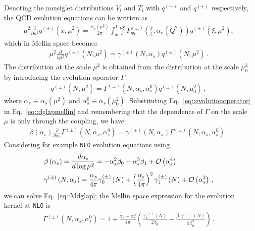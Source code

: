 Denoting the nonsiglet distributions $V_i$ and $T_i$ with $q^{(-)}$ and
$q^{(+)} $ respectively, the QCD evolution equations can be written as
\begin{align}
    \mu^2\frac{\partial }{\partial \mu^2} q^{(\pm)}\left(x,\mu^2\right) = 
    \frac{\alpha_s(\mu^2)}{2\pi}
    \int_{x}^{1}\frac{d\xi}{\xi}\, 
    P_{qq}^{(\pm)}\left(\frac{x}{\xi},\alpha_s(Q^2)\right)
    q^{(\pm)}\left(\xi,\mu^2\right),
\end{align}
which in Mellin space becomes
\begin{align}
\label{eq::dglapmellin}
    \mu^2\frac{\partial }{\partial \mu^2} q^{(\pm)}\left(N,\mu^2\right) = 
    \gamma^{(\pm)}\left(N, \alpha_s\right) q^{(\pm)}\left(N,\mu^2\right)\, .
\end{align}
The distribution at the scale $\mu^2$ is obtained from the distribution at the
scale $\mu_0^2$ by introducing the evolution operator $\Gamma$
\begin{align}
\label{eq::evolutionoperator}
    q^{(\pm)}\left(N,\mu^2\right) = 
    \Gamma^{(\pm)}\left(N,\alpha_s,\alpha_s^0\right)
    q^{(\pm)}\left(N,\mu_0^2\right)\, ,
\end{align}
where $\alpha_s \equiv \alpha_s\left(\mu^2\right)$ and $\alpha_s^0 \equiv
\alpha_s\left(\mu_0^2\right)$. Substituting Eq.~\eqref{eq::evolutionoperator} in
Eq.~\eqref{eq::dglapmellin} and remembering that the dependence of $\Gamma$ on
the scale $\mu$ is only through the coupling, we have
\begin{align}
\label{eq::Mdglap}
    \beta\left(\alpha_s\right) \frac{\partial}{\partial\alpha_s}
    \Gamma^{(\pm)}\left(N,\alpha_s,\alpha_s^0\right) = 
    \gamma^{(\pm)}\left(N, \alpha_s\right)
    \Gamma^{(\pm)}\left(N,\alpha_s,\alpha_s^0\right)\, .
\end{align}
%
Considering for example {\tt NLO} evolution equations using 
\begin{align}
    & \beta\left(\alpha_s\right) = \frac{d\alpha_s}{d\log \mu^2} = 
    -\alpha_s^2 \beta_0 -\alpha_s^3 \beta_1 + \mathcal{O}\left( \alpha_s^4 \right)  \\
    & \gamma^{(\pm)}\left(N, \alpha_s\right) = 
    \frac{\alpha_s}{4\pi} \gamma^{(\pm)}_0\left(N\right) + 
    \left(\frac{\alpha_s}{4\pi}\right)^2 \gamma^{(\pm)}_1\left(N\right) + \mathcal{O}\left( \alpha_s^3 \right)\, ,
\end{align}
we can solve Eq.~\eqref{eq::Mdglap}; the Mellin space expression for the evolution
kernel at {\tt NLO} is
\begin{align}
    \Gamma^{(\pm)}\left(N,\alpha_s,\alpha_s^0\right) = 
    1 + \frac{\alpha_s -\alpha_s^0}{4\pi}
    \left(\frac{\gamma^{(\pm)}_1 \left(N\right)}{2\beta_0} - 
    \frac{\beta_1 \gamma^{(\pm)}_0\left(N\right)}{2\beta_0^2}\right)
    \,.
\end{align}
